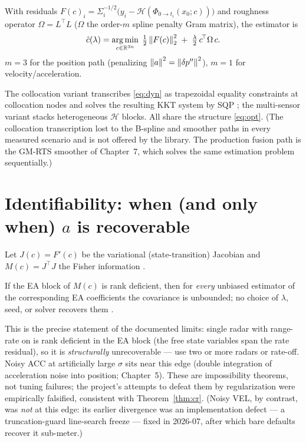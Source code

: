 \begin{definition}
With residuals $F(c)_i=\Sigma_i^{-1/2}\big(y_i-\mathcal H(\Phi_{0\to
t_i}(x_0;c))\big)$ and roughness operator $\Omega=L^{\!\top}\!L$
($\Omega$ the order-$m$ spline penalty Gram matrix), the estimator is
\begin{equation}
\hat c(\lambda)=\operatorname*{arg\,min}_{c\in\mathbb{R}^{3n}}\;
 \tfrac12\left\lVert F(c)\right\rVert_2^{2}\;+\;\tfrac{\lambda}{2}\,c^{\!\top}\Omega\,c .
\label{eq:opt}
\end{equation}
$m=3$ for the position path (penalizing
$\left\lVert a\right\rVert^{2}=\left\lVert\delta p''\right\rVert^{2}$), $m=1$ for velocity/acceleration.
\end{definition}

The collocation variant transcribes \eqref{eq:dyn} as trapezoidal equality
constraints at collocation nodes and solves the resulting KKT system by
SQP \cite{betts2010,nocedal2006}; the multi-sensor variant stacks
heterogeneous $\mathcal H$ blocks. All share the structure
\eqref{eq:opt}. (The collocation transcription lost to the B-spline and
smoother paths in every measured scenario and is not offered by the
library. The
production fusion path is the GM-RTS smoother of Chapter~7, which solves
the same estimation problem sequentially.)

\section{Identifiability: when (and only when) $a$ is recoverable}

Let $J(c)=F'(c)$ be the variational (state-transition) Jacobian and
$M(c)=J^{\!\top}\!J$ the Fisher information \cite{rao1945}.

\begin{theorem}
\label{thm:cr}
If the EA block of $M(c)$ is rank deficient, then for \emph{every}
unbiased estimator of the corresponding EA coefficients the covariance is
unbounded; no choice of $\lambda$, seed, or solver recovers them
\cite{rao1945,walter1997}.
\end{theorem}

\begin{remark}
This is the precise statement of the documented limits: single radar with
range-rate on is rank deficient in the EA block (the free state variables
span the rate residual), so it is \emph{structurally} unrecoverable ---
use two or more radars or rate-off. Noisy ACC at artificially large
$\sigma$ sits near this edge (double integration of acceleration noise
into position; Chapter~5). These are impossibility theorems, not tuning
failures; the project's attempts to defeat them by regularization were
empirically falsified, consistent with Theorem~\ref{thm:cr}. (Noisy VEL,
by contrast, was \emph{not} at this edge: its earlier divergence was an
implementation defect --- a truncation-guard line-search freeze --- fixed
in 2026-07, after which bare defaults recover it sub-meter.)
\end{remark}

